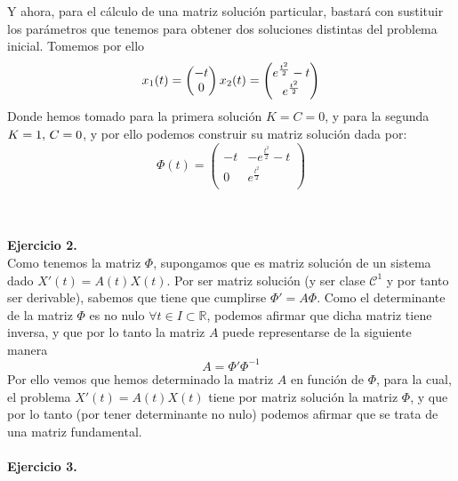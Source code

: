 \documentclass[fleqn]{article}
\def\R{\mathds{R}}
\begin{document}
    Y ahora, para el cálculo de una matriz solución particular, bastará con sustituir los parámetros que tenemos para obtener dos soluciones distintas del problema
    inicial. Tomemos por ello
    \begin{equation*}
        x_1(t) = 
        \begin{pmatrix}
            -t \\
            0 \\
        \end{pmatrix}\\
        x_2(t) = 
        \begin{pmatrix}
            e^{\frac{t^2}{2}} - t \\
            e^{\frac{t^2}{2}} \\
        \end{pmatrix}
    \end{equation*}
    Donde hemos tomado para la primera solución $K=C=0$, y para la segunda $K=1, \thinspace C=0 $, y por ello podemos construir su matriz solución dada por:
    $$
        \Phi (t) = 
        \begin{pmatrix}
            -t & -e^{\frac{t^2}{2}} - t \\
            0 & e^{\frac{t^2}{2}} \\           
        \end{pmatrix}
    $$\\ \\

    \newpage 

    \textbf{Ejercicio 2. } \\

    Como tenemos la matriz $\Phi$, supongamos que es matriz solución de un sistema dado $X'(t) = A(t) X(t)$. Por ser matriz solución (y ser clase $\mathcal{C}^1$ y por tanto
    ser derivable), sabemos que tiene que cumplirse $\Phi' = A\Phi$. Como el determinante de la matriz $\Phi$ es no nulo $\forall t \in I\subset \R$, podemos afirmar que dicha matriz 
    tiene inversa, y que por lo tanto la matriz $A$ puede representarse de la siguiente manera
    $$A=\Phi' \Phi^{-1}$$
    Por ello vemos que hemos determinado la matriz $A$ en función de $\Phi$, para la cual, el problema $X'(t) = A(t) X(t)$ tiene por matriz solución la matriz $\Phi$, y que  por lo tanto (por tener
    determinante no nulo) podemos afirmar que se trata de una matriz fundamental.\\ \\

    \textbf{Ejercicio 3. } \\
\end{document}

